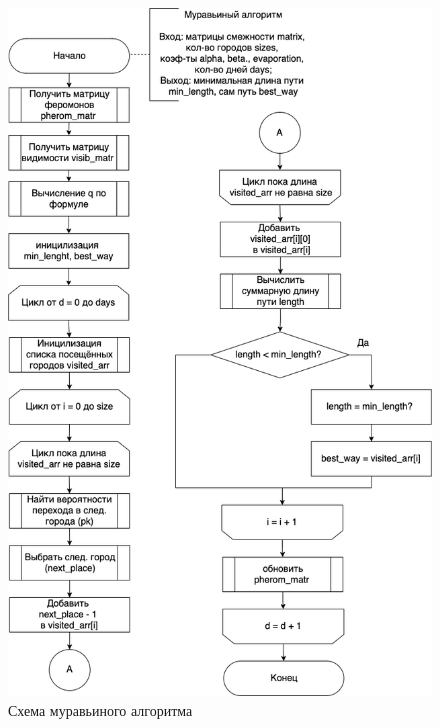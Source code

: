 \documentclass[a4paper,14pt, unknownkeysallowed]{extreport}
\begin{document}
\begin{figure}[h]
	\centering
	\includegraphics[scale=0.55]{img/ant_alg_scheme.png}
	\caption{Схема муравьиного алгоритма}
	\label{fig:ant_alg_scheme}
\end{figure}

\clearpage
\end{document}
